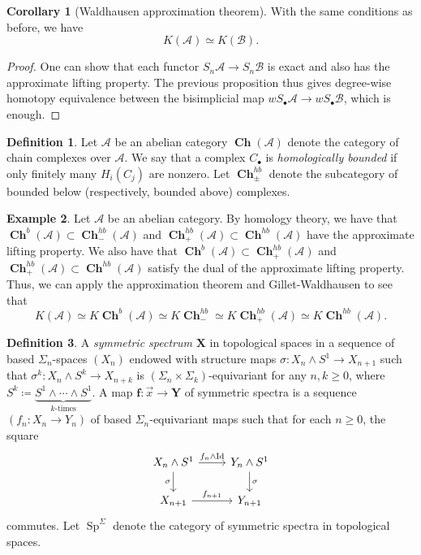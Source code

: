 \documentclass[10pt,letterpaper,cm]{nupset}
\theoremstyle{definition}
\newtheorem{definition}{Definition}
\newtheorem{exmp}[definition]{Example}
\theoremstyle{theorem}
\newtheorem{corollary}[theorem]{Corollary}
\theoremstyle{remark}
\newcommand{\X}{\mathbf X}
\newcommand{\1}{\mathbf{1}}
\renewcommand{\a}{\mathscr{A}}
\renewcommand{\b}{\mathscr{B}}
\newcommand{\x}{\vec x}
\newcommand{\0}{\vec 0}
\DeclareMathOperator{\id}{Id}
\DeclareMathOperator{\Sp}{Sp}
\DeclareMathOperator{\ch}{\mathbf{Ch}}
\begin{document}
\begin{corollary}[Waldhausen approximation theorem]
With the same conditions as before, we have $$K(\a) \simeq K(\b).$$
\end{corollary}
\begin{proof}
One can show that each functor $S_n \a \to S_n \b$ is exact and also has the approximate lifting property.  The previous proposition thus gives degree-wise homotopy equivalence between the bisimplicial map $wS_{\bullet}\a \to wS_{\bullet} \b$, which is enough. 
\end{proof}

\begin{definition}
Let $\a$ be an abelian category $\ch(\a)$ denote the category of chain complexes over $\a$. We say that a complex $C_{\bullet}$ is \textit{homologically bounded} if only finitely many $H_i(C_j)$ are nonzero. Let $\ch_{\pm}^{hb}$ denote the subcategory of bounded below (respectively, bounded above) complexes. 
\end{definition}

\begin{exmp}
Let $\a$ be an abelian category. By homology theory, we have that $\ch^b(\a) \subset \ch_{-}^{hb}(\a)$ and $\ch_+^{hb}(\a)\subset \ch^{hb}(\a)$ have the approximate lifting property. We also have that $\ch^b(\a) \subset \ch_+^{hb}(\a)$ and $\ch_+^{hb}(\a)\subset \ch^{hb}(\a)$ satisfy the dual of the approximate lifting property. Thus, we can apply the approximation theorem and Gillet-Waldhausen to see that $$  K(\a) \simeq K\ch^b(\a) \simeq  K\ch_{-}^{hb}\simeq K\ch_{+}^{hb}(\a) \simeq K \ch^{hb}(\a).$$
\end{exmp}

\begin{definition}
 A \textit{symmetric spectrum} $\X$ in topological spaces in a sequence of based $\Sigma_n$-spaces $(X_n)$ endowed with structure maps $\sigma : X_n \land S^1 \to X_{n+1}$ such that $\sigma^k : X_n \land S^k \to X_{n+k}$ is $(\Sigma_{n}\times \Sigma_{k})$-equivariant for any $n,k\geq 0$, where $S^k \coloneqq \underbrace{S^1 \land \cdots \land S^1}_{k\text{-times}}$. A map $\mathbf{f} : \x \to \mathbf{Y}$ of symmetric spectra is a sequence $\left(f_n : X_n \to Y_n\right)$ of based $\Sigma_n$-equivariant maps such that for each $n\geq 0$, the square
\[
\begin{tikzcd}
X_n \land S^1 \arrow[d, "\sigma"'] \arrow[r, "f_n \land \id"] & Y_n \land S^1 \arrow[d, "\sigma"] \\
X_{n+1} \arrow[r, "f_{n+1}"] & Y_{n+1}
\end{tikzcd}
\]
commutes. Let $\Sp^{\Sigma}$ denote the category of symmetric spectra in topological spaces.
\end{definition}
\end{document}
